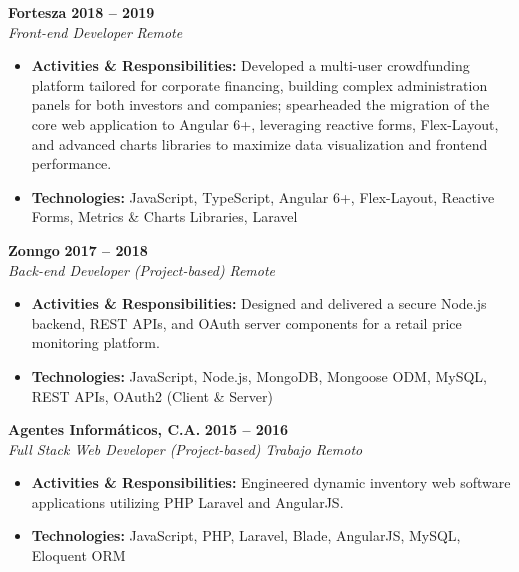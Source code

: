 \documentclass[10pt,a4paper]{article}
\begin{document}
\vspace{6pt}

\noindent\textbf{Fortesza} \hfill \textbf{2018 -- 2019} \\
\textit{Front-end Developer} \hfill \textit{Remote}
\begin{itemize}
    \item \textbf{Activities \& Responsibilities:} Developed a multi-user crowdfunding platform tailored for corporate financing, building complex administration panels for both investors and companies; spearheaded the migration of the core web application to Angular 6+, leveraging reactive forms, Flex-Layout, and advanced charts libraries to maximize data visualization and frontend performance.
    \item \textbf{Technologies:} JavaScript, TypeScript, Angular 6+, Flex-Layout, Reactive Forms, Metrics \& Charts Libraries, Laravel
\end{itemize}

\vspace{6pt}

\noindent\textbf{Zonngo} \hfill \textbf{2017 -- 2018} \\
\textit{Back-end Developer (Project-based)} \hfill \textit{Remote}
\begin{itemize}
    \item \textbf{Activities \& Responsibilities:} Designed and delivered a secure Node.js backend, REST APIs, and OAuth server components for a retail price monitoring platform.
    \item \textbf{Technologies:} JavaScript, Node.js, MongoDB, Mongoose ODM, MySQL, REST APIs, OAuth2 (Client \& Server)
\end{itemize}

\vspace{6pt}

\noindent\textbf{Agentes Informáticos, C.A.} \hfill \textbf{2015 -- 2016} \\
\textit{Full Stack Web Developer (Project-based)} \hfill \textit{Trabajo Remoto}
\begin{itemize}
    \item \textbf{Activities \& Responsibilities:} Engineered dynamic inventory web software applications utilizing PHP Laravel and AngularJS.
    \item \textbf{Technologies:} JavaScript, PHP, Laravel, Blade, AngularJS, MySQL, Eloquent ORM
\end{itemize}

\vspace{6pt}
\end{document}
